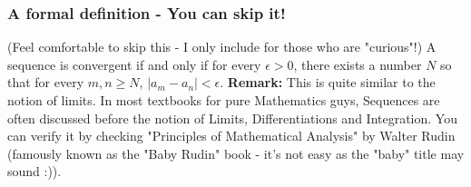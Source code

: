 \documentclass{article}
\begin{document}
\subsubsection{A formal definition - You can skip it!}
(Feel comfortable to skip this - I only include for those who are "curious"!) \newline \newline 
A sequence is convergent if and only if for every $ \epsilon > 0 $, there exists a number $N$ so that for every $m, n \geq N$, $|a_{m} - a_{n}| < \epsilon$.
\newline 
\newline 
\textbf{Remark:} This is quite similar to the notion of limits. In most textbooks for pure Mathematics guys, Sequences are often discussed before the notion of Limits, Differentiations and Integration. You can verify it by checking "Principles of Mathematical Analysis" by Walter Rudin (famously known as the "Baby Rudin" book - it's not easy as the "baby" title may sound :)). 
\end{document}
